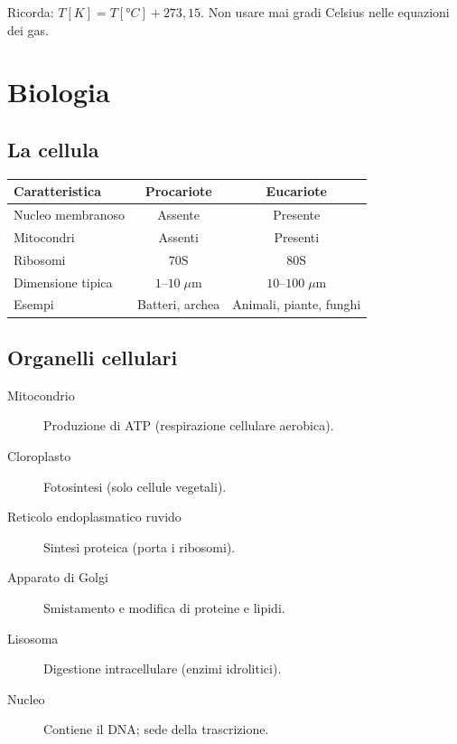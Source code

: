 \documentclass[12pt, a4paper, twoside, openright]{book}
\theoremstyle{definition}
\begin{document}
\begin{attenzione}
Ricorda: $T[\si{K}] = T[°C] + 273{,}15$. Non usare mai gradi Celsius nelle equazioni dei gas.
\end{attenzione}

\chapter{Biologia}

\section{La cellula}

\begin{defbox}
\begin{center}
\renewcommand{\arraystretch}{1.2}
\begin{tabular}{lcc}
\toprule
\textbf{Caratteristica} & \textbf{Procariote} & \textbf{Eucariote} \\
\midrule
Nucleo membranoso & Assente & Presente \\
Mitocondri & Assenti & Presenti \\
Ribosomi & $70\mathrm{S}$ & $80\mathrm{S}$ \\
Dimensione tipica & $1$--$10\;\mu\mathrm{m}$ & $10$--$100\;\mu\mathrm{m}$ \\
Esempi & Batteri, archea & Animali, piante, funghi \\
\bottomrule
\end{tabular}
\end{center}
\end{defbox}

\section{Organelli cellulari}

\begin{defbox}
\begin{description}
  \item[Mitocondrio] Produzione di ATP (respirazione cellulare aerobica).
  \item[Cloroplasto] Fotosintesi (solo cellule vegetali).
  \item[Reticolo endoplasmatico ruvido] Sintesi proteica (porta i ribosomi).
  \item[Apparato di Golgi] Smistamento e modifica di proteine e lipidi.
  \item[Lisosoma] Digestione intracellulare (enzimi idrolitici).
  \item[Nucleo] Contiene il DNA; sede della trascrizione.
\end{description}
\end{defbox}
\end{document}

